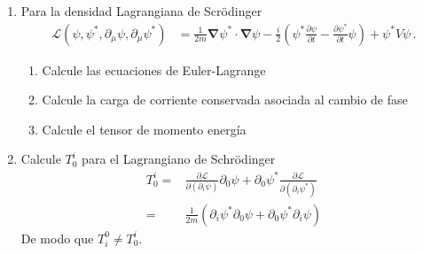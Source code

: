 \begin{enumerate}

\item Para la densidad Lagrangiana de Scrödinger
    \begin{align}
      \mathcal{L}(\psi,\psi^*,\partial_\mu\psi,\partial_\mu\psi^*)
&=\frac{1}{2m}\boldsymbol{\nabla}\psi^*\cdot\boldsymbol{\nabla}\psi-\frac{i}{2}
  \left(
\psi^*\frac{\partial\psi}{\partial t}-\frac{\partial\psi^*}{\partial t}\psi
  \right)+\psi^*V\psi\,.
  \end{align}

\begin{enumerate}
\item Calcule las ecuaciones de Euler-Lagrange 
\item Calcule la carga de corriente conservada asociada al cambio de fase 

\item Calcule el tensor de momento energía

\end{enumerate}
  
\item Calcule $T^i_0$ para el Lagrangiano de Schr\"odinger
  \begin{align}
    T^i_0=&\frac{\partial\mathcal{L}}{\partial(\partial_i \psi)}\partial_0\psi+\partial_0\psi^*\frac{\partial\mathcal{L}}{\partial(\partial_i \psi^*)}\nonumber\\
    =&\frac{1}{2m}\left(\partial_i\psi^*\partial_0\psi+\partial_0\psi^*\partial_i\psi \right)
  \end{align}
De modo que $T^0_i\neq T^i_0$.

\end{enumerate}


\renewcommand{\labelenumi}{\theenumi} %
